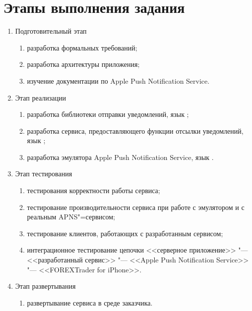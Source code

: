 \section{Этапы выполнения задания}
\label{sec:practice:task_steps}

\begin{enumerate}
  \item Подготовительный этап
  \begin{enumerate}
    \item разработка формальных требований;
    \item разработка архитектуры приложения;
    \item изучение документации по Apple Push Notification Service.
  \end{enumerate}
  
  \item Этап реализации
  \begin{enumerate}
    \item разработка библиотеки отправки уведомлений, язык \csharp{};
    \item разработка сервиса, предоставляющего функции отсылки уведомлений, язык \csharp{};
    \item разработка эмулятора Apple Push Notification Service, язык \fsharp{}.
  \end{enumerate}

  \item Этап тестирования
  \begin{enumerate}
    \item тестирования корректности работы сервиса;
    \item тестирование производительности сервиса при работе с эмулятором и с реальным APNS"=сервисом;
    \item тестирование клиентов, работающих с разработанным сервисом;
    \item интеграционное тестирование цепочки <<серверное приложение>> "--- <<разработанный сервис>> "--- <<Apple Push Notification Service>> "--- <<FOREXTrader for iPhone\texttrademark>>.
  \end{enumerate}

  \item Этап развертывания
  \begin{enumerate}
    \item развертывание сервиса в среде заказчика.
  \end{enumerate}
\end{enumerate}

